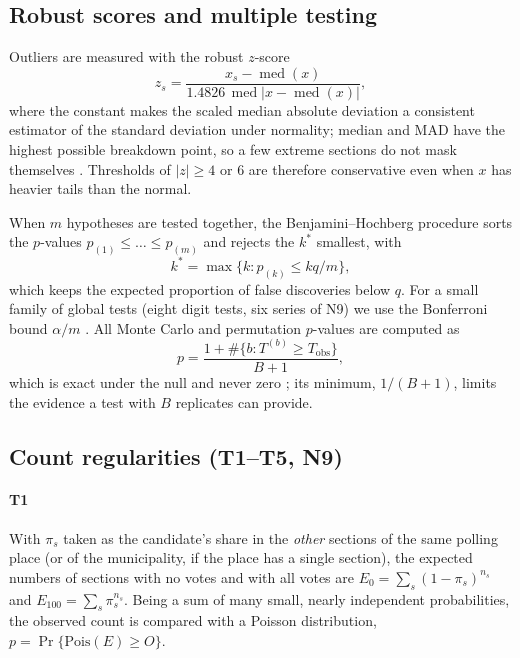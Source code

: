 \subsection{Robust scores and multiple testing}

Outliers are measured with the robust $z$-score
\begin{equation}
z_s=\frac{x_s-\operatorname{med}(x)}{1.4826\,\operatorname{med}\bigl|x-\operatorname{med}(x)\bigr|},
\label{eq:zrob}
\end{equation}
where the constant makes the scaled median absolute deviation a consistent
estimator of the standard deviation under normality; median and MAD have
the highest possible breakdown point, so a few extreme sections do not mask
themselves \cite{hampel1974,leys2013}. Thresholds of $|z|\geq4$ or $6$ are
therefore conservative even when $x$ has heavier tails than the normal.

When $m$ hypotheses are tested together, the Benjamini--Hochberg procedure
\cite{benjamini1995} sorts the $p$-values $p_{(1)}\leq\dots\leq p_{(m)}$ and
rejects the $k^\ast$ smallest, with
\begin{equation}
k^\ast=\max\{k: p_{(k)}\leq kq/m\},
\label{eq:bh}
\end{equation}
which keeps the expected proportion of false discoveries below $q$. For a
small family of global tests (eight digit tests, six series of N9) we use
the Bonferroni bound $\alpha/m$ \cite{dunn1961}. All Monte Carlo and
permutation $p$-values are computed as
\begin{equation}
p=\frac{1+\#\{b: T^{(b)}\geq T_{\mathrm{obs}}\}}{B+1},
\label{eq:pmc}
\end{equation}
which is exact under the null and never zero \cite{phipson2010}; its
minimum, $1/(B+1)$, limits the evidence a test with $B$ replicates can
provide.

\subsection{Count regularities (T1--T5, N9)}

\paragraph{T1} With $\pi_s$ taken as the candidate's share in the
\emph{other} sections of the same polling place (or of the municipality, if
the place has a single section), the expected numbers of sections with no
votes and with all votes are
$E_0=\sum_s(1-\pi_s)^{n_s}$ and $E_{100}=\sum_s\pi_s^{n_s}$. Being a sum of
many small, nearly independent probabilities, the observed count is
compared with a Poisson distribution, $p=\Pr\{\mathrm{Pois}(E)\geq O\}$.


